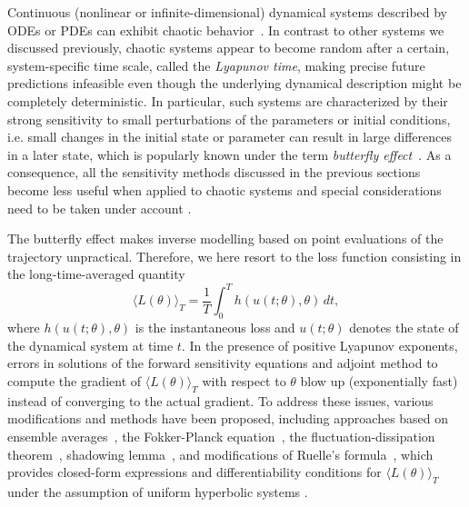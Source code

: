 Continuous (nonlinear or infinite-dimensional) dynamical systems described by ODEs or PDEs can exhibit chaotic behavior~\cite{strogatz2018nonlinear}. 
In contrast to other systems we discussed previously, chaotic systems appear to become random after a certain, system-specific time scale, called the \textit{Lyapunov time}, making precise future predictions infeasible even though the underlying dynamical description might be completely deterministic.
In particular, such systems are characterized by their strong sensitivity to small perturbations of the parameters or initial conditions, i.e. small changes in the initial state or parameter can result in large differences in a later state, which is popularly known under the term \textit{butterfly effect}~\cite{Lorenz.1963}. 
As a consequence, all the sensitivity methods discussed in the previous sections become less useful when applied to chaotic systems and special considerations need to be taken under account \cite{Wang2012-chaos-adjoint}.

The butterfly effect makes inverse modelling based on point evaluations of the trajectory unpractical. 
Therefore, we here resort to the loss function consisting in the long-time-averaged quantity 
\begin{equation}\label{eq:long_time_averaged_quantities}
    \langle L(\theta) \rangle_T = \frac{1}{T} \int_0^T h(u(t; \theta), \theta) \, dt, 
\end{equation}
where $h(u(t; \theta), \theta)$ is the instantaneous loss and $u(t; \theta)$ denotes the state of the dynamical system at time $t$.
In the presence of positive Lyapunov exponents, errors in solutions of the forward sensitivity equations and adjoint method to compute the gradient of $\langle L(\theta) \rangle_T$ with respect to $\theta$ blow up (exponentially fast) instead of converging to the actual gradient.
To address these issues, various modifications and methods have been proposed, including approaches based on ensemble averages~\cite{lea2000sensitivity, eyink2004ruelle}, the Fokker-Planck equation~\cite{thuburn2005climate, blonigan2014probability}, the fluctuation-dissipation theorem~\cite{leith1975climate, abramov2007blended, abramov2008new}, shadowing lemma~\cite{wang2013forward, wang2014least, wang2014convergence, ni2017sensitivity, blonigan2017adjoint, blonigan2018multiple, ni2019adjoint, ni2019sensitivity}, and modifications of Ruelle's formula~\cite{chandramoorthy2022efficient, ni2020fast}, which provides closed-form expressions and differentiability conditions for $ \langle L(\theta) \rangle_T$ under the assumption of uniform hyperbolic systems \cite{ruelle1997differentiation,ruelle2009review}.

